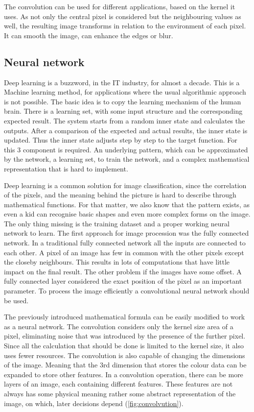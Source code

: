 The convolution can be used for different applications, based on the kernel it uses.
As not only the central pixel is considered but the neighbouring values as well, the resulting image transforms in relation to the environment of each pixel.
It can smooth the image, can enhance the edges or blur.


\subsection{Neural network} %
Deep learning is a buzzword, in the IT industry, for almost a decade.
This is a Machine learning method, for applications where the usual algorithmic approach is not possible.
The basic idea is to copy the learning mechanism of the human brain.
There is a learning set, with some input structure and the corresponding expected result.
The system starts from a random inner state and calculates the outputs.
After a comparison of the expected and actual results, the inner state is updated.
Thus the inner state adjusts step by step to the target function.
For this 3 component is required.
An underlying pattern, which can be approximated by the network, a learning set, to train the network, and a complex mathematical representation that is hard to implement.

Deep learning is a common solution for image classification, since the correlation of the pixels, and the meaning behind the picture is hard to describe through mathematical functions.
For that matter, we also know that the pattern exists, as even a kid can recognise basic shapes and even more complex forms on the image.
The only thing missing is the training dataset and a proper working neural network to learn.
The first approach for image procession was the fully connected network.
In a traditional fully connected network all the inputs are connected to each other.
A pixel of an image has few in common with the other pixels except the closeby neighbours.
This results in lots of computations that have little impact on the final result.
The other problem if the images have some offset.
A fully connected layer considered the exact position of the pixel as an important parameter.
To process the image efficiently a convolutional neural network should be used.

The previously introduced mathematical formula can be easily modified to work as a neural network.
The convolution considers only the kernel size area of a pixel, eliminating noise that was introduced by the presence of the further pixel.
Since all the calculation that should be done is limited to the kernel size, it also uses fewer resources.
The convolution is also capable of changing the dimensions of the image.
Meaning that the 3rd dimension that stores the colour data can be expanded to store other features.
In a convolution operation, there can be more layers of an image, each containing different features.
These features are not always has some physical meaning rather some abstract representation of the image, on which, later decisions depend (\cref{fig:convolvution}).

